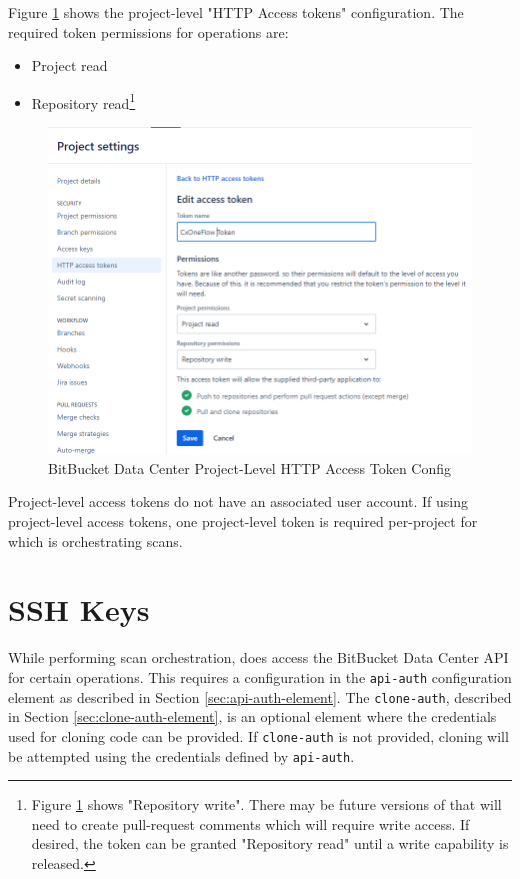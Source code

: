 Figure \ref{fig:bbdc-token-config} shows the project-level "HTTP Access tokens" configuration.  The required
token permissions for \cxoneflow operations are:

\begin{itemize}
    \item Project read
    \item Repository read\footnote{Figure \ref{fig:bbdc-token-config} shows "Repository write".  There may be future versions of \cxoneflow that will need to create pull-request comments which will require write access.  If desired, the token can be granted "Repository read" until a write capability is released.}
\end{itemize}


\begin{figure}[h]
    \includegraphics[width=\textwidth]{graphics/bbdc-token-config.png}
    \caption{BitBucket Data Center Project-Level HTTP Access Token Config}
    \label{fig:bbdc-token-config}
\end{figure}

Project-level access tokens do not have an associated user account.  If using project-level
access tokens, one project-level token is required per-project for which \cxoneflow is
orchestrating scans.

\section{\cxoneflow SSH Keys}

While performing scan orchestration, \cxoneflow does access the BitBucket Data Center API for
certain operations.  This requires a configuration in the \texttt{api-auth} configuration
element as described in Section \ref{sec:api-auth-element}.  The \texttt{clone-auth},
described in Section \ref{sec:clone-auth-element}, is an optional element where the credentials
used for cloning code can be provided.  If \texttt{clone-auth} is not provided, cloning will
be attempted using the credentials defined by \texttt{api-auth}.

